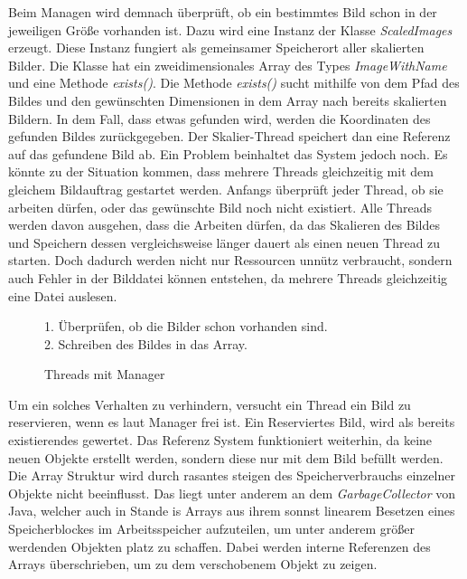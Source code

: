 Beim Managen wird demnach überprüft, ob ein bestimmtes Bild schon in der jeweiligen Größe vorhanden ist. Dazu wird eine Instanz der Klasse \textit{ScaledImages} erzeugt. Diese Instanz fungiert als gemeinsamer Speicherort aller skalierten Bilder. Die Klasse hat ein zweidimensionales Array des Types \textit{ImageWithName} und eine Methode \textit{exists()}. Die Methode \textit{exists()} sucht mithilfe von dem Pfad des Bildes und den gewünschten Dimensionen in dem Array nach bereits skalierten Bildern. In dem Fall, dass etwas gefunden wird, werden die Koordinaten des gefunden Bildes zurückgegeben. Der Skalier-Thread speichert dan eine Referenz auf das gefundene Bild ab.
\medskip
\newline
Ein Problem beinhaltet das System jedoch noch. Es könnte zu der Situation kommen, dass mehrere Threads gleichzeitig mit dem gleichem Bildauftrag gestartet werden. Anfangs überprüft jeder Thread, ob sie arbeiten dürfen, oder das gewünschte Bild noch nicht existiert. Alle Threads werden davon ausgehen, dass die Arbeiten dürfen, da das Skalieren des Bildes und Speichern dessen vergleichsweise länger dauert als einen neuen Thread zu starten. Doch dadurch werden nicht nur Ressourcen unnütz verbraucht, sondern auch Fehler in der Bilddatei können entstehen, da mehrere Threads gleichzeitig eine Datei auslesen.

\begin{figure}[h]
    \centering
    \begin{minipage}{89mm}
        \fontsize{10pt}{11pt}\selectfont
        \def\svgwidth{8cm}
        
    \end{minipage}
    \begin{minipage}{1\textwidth-91mm}
        1. Überprüfen, ob die Bilder schon vorhanden sind.\\
        2. Schreiben des Bildes in das Array.
    \end{minipage}
    \caption[Thread und Manager]{Threads mit Manager}
\end{figure}

Um ein solches Verhalten zu verhindern, versucht ein Thread ein Bild zu reservieren, wenn es laut Manager frei ist. Ein Reserviertes Bild, wird als bereits existierendes gewertet. Das Referenz System funktioniert weiterhin, da keine neuen Objekte erstellt werden, sondern diese nur mit dem Bild befüllt werden. Die Array Struktur wird durch rasantes steigen des Speicherverbrauchs einzelner Objekte nicht beeinflusst. Das liegt unter anderem an dem \textit{GarbageCollector} von Java, welcher auch in Stande is Arrays aus ihrem sonnst linearem Besetzen eines Speicherblockes im Arbeitsspeicher aufzuteilen, um unter anderem größer werdenden Objekten platz zu schaffen. Dabei werden interne Referenzen des Arrays überschrieben, um zu dem verschobenem Objekt zu zeigen.


